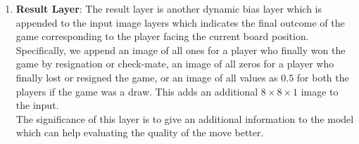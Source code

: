 \begin{enumerate}
\item \textbf{Result Layer}: The result layer is another dynamic bias layer 
which is appended to the input image layers which indicates the final outcome of 
the game corresponding to the player facing the current board position. 
Specifically, we append an image of all ones for a player who finally won the 
game by resignation or check-mate, an image of all zeros for a player who 
finally lost or resigned the game, or an image of all values as $0.5$ for both 
the players if the game was a draw. This adds an additional $8\times 8\times 1$ 
image to the input.\\
The significance of this layer is to give an additional information to the model 
which can help evaluating the quality of the move better.\\

\end{enumerate}
